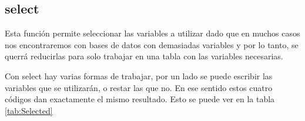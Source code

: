 \documentclass[]{book}
\newenvironment{Shaded}{\begin{snugshade}}{\end{snugshade}}
\newcommand{\KeywordTok}[1]{\textcolor[rgb]{0.13,0.29,0.53}{\textbf{#1}}}
\newcommand{\NormalTok}[1]{#1}
\newcommand{\OperatorTok}[1]{\textcolor[rgb]{0.81,0.36,0.00}{\textbf{#1}}}
\newcommand{\StringTok}[1]{\textcolor[rgb]{0.31,0.60,0.02}{#1}}
\begin{document}
\hypertarget{select}{%
\subsection{select}\label{select}}

Esta función permite seleccionar las variables a utilizar dado que en
muchos casos nos encontraremos con bases de datos con demasiadas
variables y por lo tanto, se querrá reducirlas para solo trabajar en una
tabla con las variables necesarias.

Con select hay varias formas de trabajar, por un lado se puede escribir
las variables que se utilizarán, o restar las que no. En ese sentido
estos cuatro códigos dan exactamente el mismo resultado. Esto se puede
ver en la tabla \ref{tab:Selected}

\begin{Shaded}
\end{Shaded}

\begin{Shaded}
\end{Shaded}

\begin{Shaded}
\end{Shaded}

\begin{Shaded}
\end{Shaded}
\end{document}
